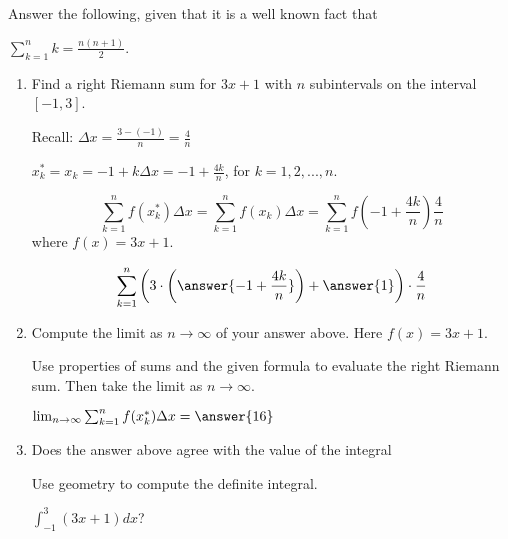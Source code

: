 \documentclass{ximera}
\author{Gregory Hartman \and Matthew Carr\and Nela Lakos}
\begin{document}
\begin{exercise}


Answer the following, given that it is a well known fact that

$\sum_{k=1}^{n}k=\frac{n(n+1)}{2}$.
\begin{enumerate}
\item Find a right Riemann sum for $3x+1$ with $n$ subintervals on the interval $[-1,3]$.
\begin{hint}
Recall: $\Delta x=\frac{3-(-1)}{n}=\frac{4}{n}$

$x_k^*=x_k=-1+k\Delta x=-1+\frac{4k}{n}$, for $k=1,2,...,n.$
\end{hint}
\begin{hint}
\[
\sum_{k=1}^n f(x_k^*)\Delta x=\sum_{k=1}^n f(x_k)\Delta x=\sum_{k=1}^n f\left(-1+\frac{4k}{n}\right)\frac{4}{n}
\]
where $f(x)=3x+1$.
\end{hint}
\begin{prompt}
\[
\sum_{k=1}^n \left(3\cdot\left(\answer{-1+\frac{4k}{n}}\right)+\answer{1}\right)\cdot\frac{4}{n}
\]
\end{prompt}

\item Compute the limit as $n\to\infty$ of your answer above. Here $f(x)=3x+1$.
\begin{hint}
Use properties of sums and the given formula to evaluate the right Riemann sum. Then take the limit as $n\to\infty$.
\end{hint}
\begin{prompt}

$\lim_{n\to\infty}\sum_{k=1}^n f(x_k^*)\Delta x= \answer{16}$

\end{prompt}
\item Does the answer above agree with the value of the integral
\begin{hint}
Use geometry to compute the definite integral.
\end{hint}
  $\int_{-1}^{3}(3x+1) dx$? \begin{multipleChoice}
   
\end{multipleChoice}
\end{enumerate}
\end{exercise}
\end{document}
